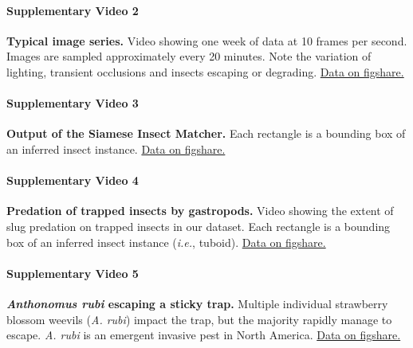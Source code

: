 \documentclass[12pt]{article}
\begin{document}
	
	\paragraph*{Supplementary Video 2}
	\textbf{Typical image series.} Video showing one week of data at 10 frames per second. Images are sampled approximately every 20 minutes. Note the variation of lighting, transient occlusions and insects escaping or degrading.
	\href{https://figshare.com/s/02944865bfd645047355}{Data on figshare.}
	
	\paragraph*{Supplementary Video 3}
	\textbf{Output of the Siamese Insect Matcher.} Each rectangle is a bounding box of an inferred insect instance.
	\href{https://figshare.com/s/096d4a80b93f8380c156}{Data on figshare.}
	
	
	\paragraph*{Supplementary Video 4}
	\textbf{Predation of trapped insects by gastropods.} Video showing the extent of slug predation on trapped insects in our dataset. Each rectangle is a bounding box of an inferred insect instance (\emph{i.e.}, tuboid).
	\href{https://figshare.com/s/889c8af79a7f90db263e}{Data on figshare.}
	
	\paragraph*{Supplementary Video 5}
	\textbf{\emph{Anthonomus rubi} escaping a sticky trap.} Multiple individual strawberry blossom weevils (\emph{A. rubi}) impact the trap, but the majority rapidly manage to escape. \emph{A. rubi} is an emergent invasive pest in North America.
	\href{https://figshare.com/s/0872dcd897ef7b82d1a3}{Data on figshare.}
	
\end{document}

